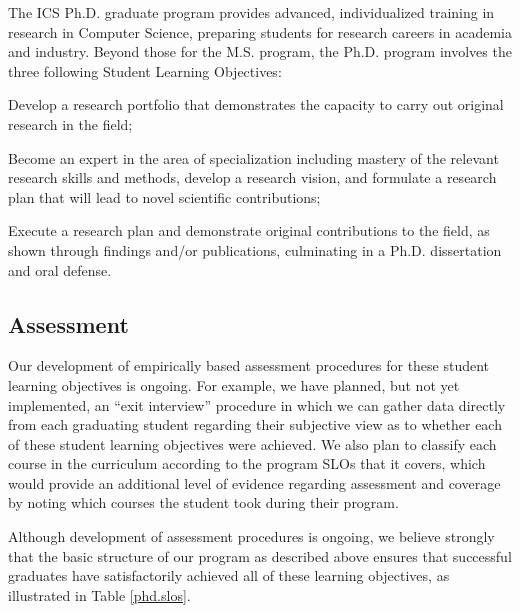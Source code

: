 \documentclass[12pt]{article}
\begin{document}
The ICS Ph.D. graduate program provides advanced, individualized training in research 
in Computer Science, preparing students for research careers in academia and industry.  
Beyond  those for the M.S. program, the Ph.D. program involves the three following 
Student Learning Objectives:

\begin{list}{.}{ \setcounter{listcounter}{6}}
\item Develop a research portfolio that demonstrates the capacity to carry out original 
research in the field;
\item Become an expert in the area of specialization including mastery of the relevant 
research skills and methods, develop a research vision, and formulate a research plan 
that will lead to novel scientiﬁc contributions;
\item Execute a research plan and demonstrate original contributions to the field, as 
shown through ﬁndings and/or publications, culminating in a Ph.D. dissertation and oral 
defense.
\end{list}

\subsection{Assessment}

Our development of empirically based assessment procedures for these student learning
objectives is ongoing.  For example, we have planned, but not yet
implemented, an ``exit interview'' procedure in which we can gather data
directly from each graduating student regarding their subjective view as to
whether each of these student learning objectives were achieved. We also
plan to classify each course in the curriculum according to the program
SLOs that it covers, which would provide an additional level of evidence
regarding assessment and coverage by noting which courses the student took
during their program. 

Although development of assessment procedures is ongoing, we believe
strongly that the basic structure of our program as described above ensures
that successful graduates have satisfactorily achieved all of these
learning objectives, as illustrated in Table \ref{phd.slos}.
\end{document}
